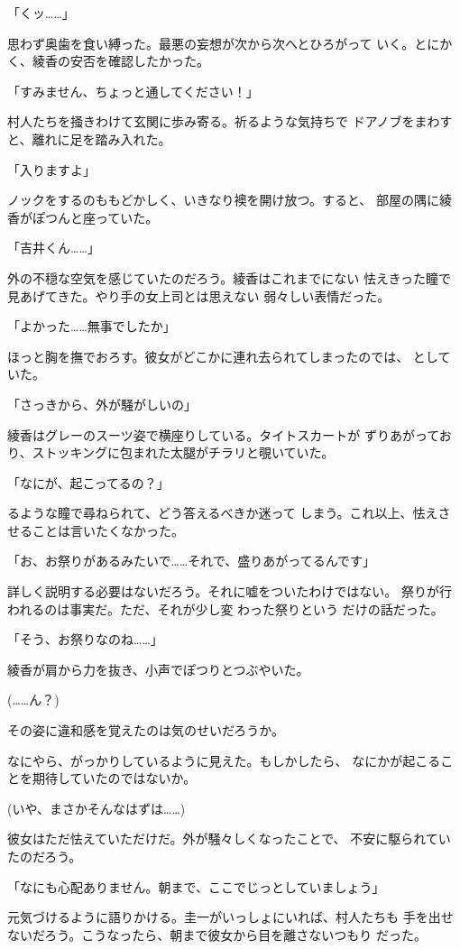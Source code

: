 ﻿\documentclass[
    book,tate,
    line_length=30zw,
    jafontsize=12pt,
    paper=b5j,
    landscape,
    ]{jlreq}
\begin{document}
「くッ……」

思わず奥歯を食い縛った。最悪の妄想が次から次へとひろがって
いく。とにかく、綾香の安否を確認したかった。

「すみません、ちょっと通してください！」

村人たちを掻きわけて玄関に歩み寄る。祈るような気持ちで
ドアノブをまわすと、離れに足を踏み入れた。

「入りますよ」

ノックをするのももどかしく、いきなり襖を開け放つ。すると、
部屋の隅に綾香がぽつんと座っていた。

「吉井くん……」

外の不穏な空気を感じていたのだろう。綾香はこれまでにない
怯えきった瞳で見あげてきた。やり手の女上司とは思えない
弱々しい表情だった。

「よかった……無事でしたか」

ほっと胸を撫でおろす。彼女がどこかに連れ去られてしまったのでは、
としていた。

「さっきから、外が騒がしいの」

綾香はグレーのスーツ姿で横座りしている。タイトスカートが
ずりあがっており、ストッキングに包まれた太腿がチラリと覗いていた。

「なにが、起こってるの？」

るような瞳で尋ねられて、どう答えるべきか迷って
しまう。これ以上、怯えさせることは言いたくなかった。

「お、お祭りがあるみたいで……それで、盛りあがってるんです」

詳しく説明する必要はないだろう。それに嘘をついたわけではない。
祭りが行われるのは事実だ。ただ、それが少し変 わった祭りという
だけの話だった。

「そう、お祭りなのね……」

綾香が肩から力を抜き、小声でぽつりとつぶやいた。

(……ん？)

その姿に違和感を覚えたのは気のせいだろうか。

なにやら、がっかりしているように見えた。もしかしたら、
なにかが起こることを期待していたのではないか。

(いや、まさかそんなはずは……)

彼女はただ怯えていただけだ。外が騒々しくなったことで、
不安に駆られていたのだろう。

「なにも心配ありません。朝まで、ここでじっとしていましょう」

元気づけるように語りかける。圭一がいっしょにいれば、村人たちも
手を出せないだろう。こうなったら、朝まで彼女から目を離さないつもり
だった。
\end{document}
